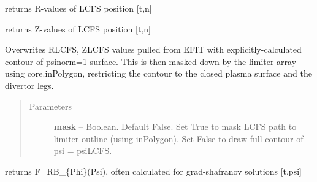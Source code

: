 \documentclass[letterpaper,10pt,english]{sphinxmanual}
\begin{document}
\begin{fulllineitems}

\begin{fulllineitems}
\label{eqtools:eqtools.EFIT.EFITTree.getRLCFS}
returns R-values of LCFS position {[}t,n{]}

\end{fulllineitems}


\begin{fulllineitems}
\label{eqtools:eqtools.EFIT.EFITTree.getZLCFS}
returns Z-values of LCFS position {[}t,n{]}

\end{fulllineitems}


\begin{fulllineitems}
\label{eqtools:eqtools.EFIT.EFITTree.remapLCFS}
Overwrites RLCFS, ZLCFS values pulled from EFIT with explicitly-calculated contour
of psinorm=1 surface.  This is then masked down by the limiter array using core.inPolygon,
restricting the contour to the closed plasma surface and the divertor legs.
\begin{quote}\begin{description}
\item[{Parameters}] \leavevmode
\textbf{mask} -- Boolean.
Default False.  Set True to mask LCFS path to limiter outline (using inPolygon).
Set False to draw full contour of psi = psiLCFS.

\end{description}\end{quote}

\end{fulllineitems}


\begin{fulllineitems}
\label{eqtools:eqtools.EFIT.EFITTree.getF}
returns F=RB\_\{Phi\}(Psi), often calculated for grad-shafranov solutions  {[}t,psi{]}

\end{fulllineitems}



\end{fulllineitems}
\end{document}
